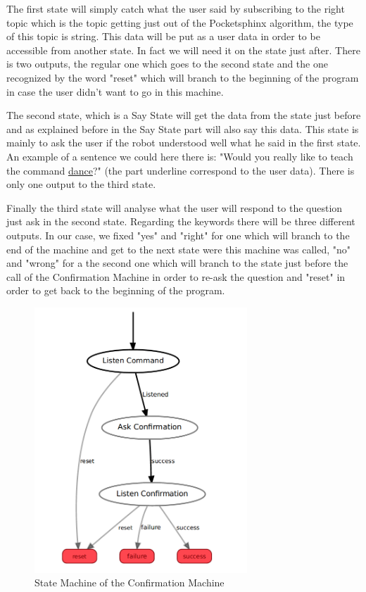 The first state will simply catch what the user said by subscribing to the right topic which is the topic getting just out of the Pocketsphinx algorithm, the type of this topic is string. This data will be put as a user data in order to be accessible from another state. In fact we will need it on the state just after. There is two outputs, the regular one which goes to the second state and the one recognized by the word "reset" which will branch to the beginning of the program in case the user didn't want to go in this machine. 

The second state, which is a Say State will get the data from the state just before and as explained before in the Say State part will also say this data. This state is mainly to ask the user if the robot understood well what he said in the first state. An example of a sentence we could here there is: "Would you really like to teach the command \underline{dance}?" (the part underline correspond to the user data). There is only one output to the third state. 

Finally the third state will analyse what the user will respond to the question just ask in the second state. Regarding the keywords there will be three different outputs. In our case, we fixed "yes" and "right" for one which will branch to the end of the machine and get to the next state were this machine was called, "no" and "wrong" for a the second one which will branch to the state just before the call of the Confirmation Machine in order to re-ask the question and "reset" in order to get back to the beginning of the program.

 \begin{figure}
 \center
 \includegraphics[width=8cm]{img_SM/ConfirmationMachine.png}
 \caption{State Machine of the Confirmation Machine}
 \end{figure}

